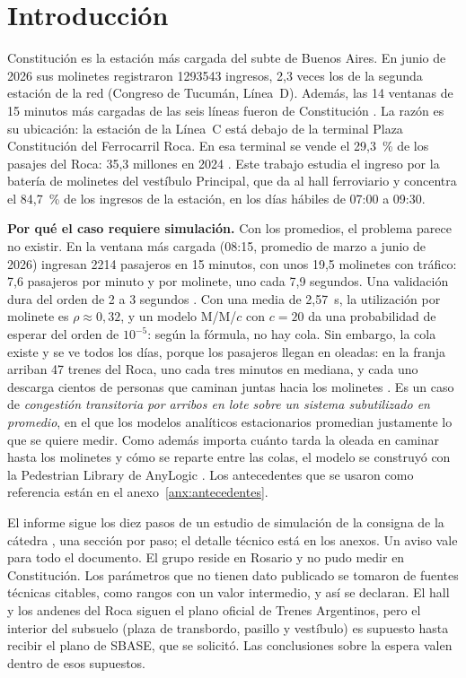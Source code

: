 \section{Introducción}
\label{sec:introduccion}

Constitución es la estación más cargada del subte de Buenos Aires. En junio de 2026 sus molinetes
registraron \num{1293543} ingresos, 2,3 veces los de la segunda estación de la red (Congreso de Tucumán,
Línea~D). Además, las 14 ventanas de 15 minutos más cargadas de las seis líneas fueron de Constitución
\parencite{sbase2026molinetes}. La razón es su ubicación: la estación de la Línea~C está debajo de la
terminal Plaza Constitución del Ferrocarril Roca. En esa terminal se vende el 29,3~\% de los pasajes del
Roca: 35,3 millones en 2024 \parencite[pp.~15 y 31]{cnrt2025amba}. Este trabajo estudia el ingreso por la
batería de molinetes del vestíbulo Principal, que da al hall ferroviario y concentra el 84,7~\% de los
ingresos de la estación, en los días hábiles de 07:00 a 09:30.

\textbf{Por qué el caso requiere simulación.} Con los promedios, el problema parece no existir. En la ventana
más cargada (08:15, promedio de marzo a junio de 2026) ingresan \num{2214} pasajeros en 15 minutos, con unos
19,5 molinetes con tráfico: 7,6 pasajeros por minuto y por molinete, uno cada 7,9 segundos. Una validación dura del orden de 2 a 3
segundos \parencite{tcqsm2013,seriani2025,wang2024}. Con una media de 2,57~s, la utilización por molinete es
$\rho \approx 0{,}32$, y un modelo M/M/$c$ con $c = 20$ da una probabilidad de esperar del orden de $10^{-5}$:
según la fórmula, no hay cola. Sin embargo, la cola existe y se ve todos los días, porque los pasajeros llegan
en oleadas: en la franja arriban 47 trenes del Roca, uno cada tres minutos en mediana, y cada uno descarga
cientos de personas que caminan juntas hacia los molinetes \parencite{trenes2026roca}. Es un caso de
\emph{congestión transitoria por arribos en lote sobre un sistema subutilizado en promedio}, en el que los
modelos analíticos estacionarios promedian justamente lo que se quiere medir. Como además importa cuánto tarda
la oleada en caminar hasta los molinetes y cómo se reparte entre las colas, el modelo se construyó con la
Pedestrian Library de AnyLogic \parencite{anylogic2026help}. Los antecedentes que se usaron como referencia
están en el anexo~\ref{anx:antecedentes}.

El informe sigue los diez pasos de un estudio de simulación de la consigna de la cátedra
\parencite{utn2026consigna,law2015}, una sección por paso; el detalle técnico está en los anexos. Un aviso
vale para todo el documento. El grupo reside en Rosario y no pudo medir en Constitución. Los parámetros que no
tienen dato publicado se tomaron de fuentes técnicas citables, como rangos con un valor intermedio, y así se
declaran. El hall y los andenes del Roca siguen el plano oficial de Trenes Argentinos, pero el interior del
subsuelo (plaza de transbordo, pasillo y vestíbulo) es supuesto hasta recibir el plano de SBASE, que se
solicitó. Las conclusiones sobre la espera valen dentro de esos supuestos.
